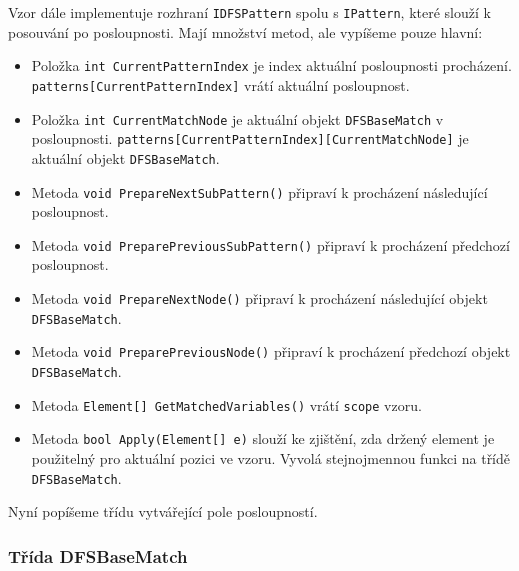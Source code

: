Vzor dále implementuje rozhraní \texttt{IDFSPattern} spolu s \texttt{IPattern}, které slouží k posouvání po posloupnosti.
Mají množství metod, ale vypíšeme pouze hlavní:
\begin{itemize}
\item Položka \texttt{int CurrentPatternIndex} je index aktuální posloupnosti procházení.
\texttt{patterns[CurrentPatternIndex]} vrátí aktuální posloupnost.

\item Položka \texttt{int CurrentMatchNode} je aktuální objekt \texttt{DFSBaseMatch} v posloupnosti.
\texttt{patterns[CurrentPatternIndex][CurrentMatchNode]} je aktuální objekt \texttt{DFSBaseMatch}.
\item Metoda \texttt{void PrepareNextSubPattern()} připraví k procházení následující posloupnost.
\item Metoda \texttt{void PreparePreviousSubPattern()} připraví k procházení předchozí posloupnost.
\item Metoda \texttt{void PrepareNextNode()} připraví k procházení následující objekt \texttt{DFSBaseMatch}.
\item Metoda \texttt{void PreparePreviousNode()} připraví k procházení předchozí objekt \texttt{DFSBaseMatch}.
\item Metoda \texttt{Element[] GetMatchedVariables()} vrátí \texttt{scope} vzoru.
\item Metoda \texttt{bool Apply(Element[] e)} slouží ke zjištění, zda držený element je použitelný pro aktuální pozici ve vzoru.
Vyvolá stejnojmennou funkci na třídě \texttt{DFSBaseMatch}.
\end{itemize}
Nyní popíšeme třídu vytvářející pole posloupností.

\subsubsection{Třída DFSBaseMatch}

